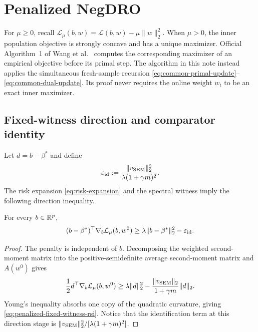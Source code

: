 \section{Penalized NegDRO}
\label{sec:penalized}

For $\mu\ge0$, recall
$\mathcal L_\mu(b,w)=\mathcal L(b,w)-\mu\|w\|_2^2$.  When $\mu>0$, the
inner population objective is strongly concave and has a unique maximizer.
Official Algorithm~1 of Wang et al.~\cite{wang2026negdro} computes the
corresponding maximizer of an empirical objective before its primal step.  The
algorithm in this note instead applies the simultaneous fresh-sample recursion
\eqref{eq:common-primal-update}--\eqref{eq:common-dual-update}.  Its proof never
requires the online weight $w_t$ to be an exact inner maximizer.

\subsection{Fixed-witness direction and comparator identity}

Let $d=b-\beta^*$ and define
\begin{equation}
  \varepsilon_{\rm id}
  :=\frac{\|v_{\rm SEM}\|_2^2}
          {\lambda(1+\gamma m)^2}.
  \label{eq:penalized-identification-error}
\end{equation}
The risk expansion \eqref{eq:risk-expansion} and the spectral witness imply
the following direction inequality.

\begin{lemma}
\label{lem:penalized-fixed-witness}
For every $b\in\mathbb{R}^p$,
\begin{equation}
  (b-\beta^*)^\top\nabla_b\mathcal L_\mu(b,w^0)
  \ge
  \lambda\|b-\beta^*\|_2^2-\varepsilon_{\rm id}.
  \label{eq:penalized-fixed-witness-rsi}
\end{equation}
\end{lemma}

\begin{proof}
The penalty is independent of $b$.  Decomposing the weighted second-moment
matrix into the positive-semidefinite average second-moment matrix and
$A(w^0)$ gives
\[
  \frac12d^\top\nabla_b\mathcal L_\mu(b,w^0)
  \ge
  \lambda\|d\|_2^2
  -\frac{\|v_{\rm SEM}\|_2}{1+\gamma m}\|d\|_2.
\]
Young's inequality absorbs one copy of the quadratic curvature, giving
\eqref{eq:penalized-fixed-witness-rsi}.  Notice that the identification term
at this direction stage is
$\|v_{\rm SEM}\|_2^2/[\lambda(1+\gamma m)^2]$.
\end{proof}


